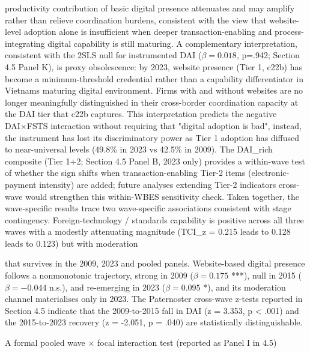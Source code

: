 \documentclass[12pt,a4paper]{article}
\begin{document}
productivity contribution of basic digital presence attenuates and may
amplify rather than relieve coordination burdens, consistent with the
view that website-level adoption alone is insufficient when deeper
transaction-enabling and process-integrating digital capability is still
maturing. A complementary interpretation, consistent with the 2SLS null
for instrumented DAI (\(\beta=0.018\), p=.942; Section 4.5 Panel K), is
proxy obsolescence: by 2023, website presence (Tier 1, c22b) has become
a minimum-threshold credential rather than a capability differentiator
in Vietnam\textquotesingle s maturing digital environment. Firms with
and without websites are no longer meaningfully distinguished in their
cross-border coordination capacity at the DAI tier that c22b captures.
This interpretation predicts the negative DAI×FSTS interaction without
requiring that "digital adoption is bad", instead, the instrument has
lost its discriminatory power as Tier 1 adoption has diffused to
near-universal levels (49.8\% in 2023 vs 42.5\% in 2009). The DAI\_rich
composite (Tier 1+2; Section 4.5 Panel B, 2023 only) provides a
within-wave test of whether the sign shifts when transaction-enabling
Tier-2 items (electronic-payment intensity) are added; future analyses
extending Tier-2 indicators cross-wave would strengthen this within-WBES
sensitivity check. Taken together, the wave-specific results trace two
wave-specific associations consistent with stage contingency.
Foreign-technology / standards capability is positive across all three
waves with a modestly attenuating magnitude (TCI\_z = 0.215 leads to
0.128 leads to 0.123) but with moderation

that survives in the 2009, 2023 and pooled panels. Website-based digital
presence follows a nonmonotonic trajectory, strong in 2009
(\(\beta = 0.175\) ***), null in 2015 (\(\beta = -0.044\) n.s.), and
re-emerging in 2023 (\(\beta = 0.095\) *), and its moderation channel
materialises only in 2023. The Paternoster cross-wave z-tests reported
in Section 4.5 indicate that the 2009-to-2015 fall in DAI (z = 3.353, p
\textless{} .001) and the 2015-to-2023 recovery (z = -2.051, p = .040)
are statistically distinguishable.

A formal pooled wave × focal interaction test (reported as Panel I in
4.5)
\end{document}
